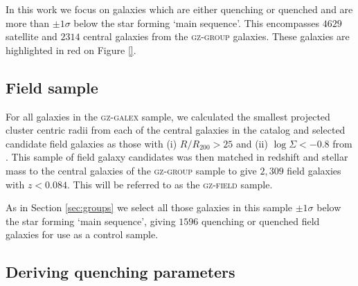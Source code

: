 \documentclass[useAMS,usenatbib]{mn2e}
\begin{document}
In this work we focus on galaxies which are either quenching or quenched and are more than $\pm1\sigma$ below the star forming `main sequence'. This encompasses $4629$ satellite and $2314$ central galaxies from the \textsc{gz-group} galaxies. These galaxies are highlighted in red on Figure \ref{}. 

\subsection{Field sample}\label{sec:field}

For all galaxies in the \textsc{gz-galex} sample, we calculated the smallest projected cluster centric radii from each of the central galaxies in the  \citet{berlind06} catalog and selected candidate field galaxies as those with (i) $R/R_{200} > 25$ and (ii) $\log\Sigma < -0.8$ from \cite{baldry06}. This sample of field galaxy candidates was then matched in redshift and stellar mass to the central galaxies of the \textsc{gz-group} sample to give $2,309$ field galaxies with $z < 0.084$. This will be referred to as the \textsc{gz-field} sample. 

As in Section \ref{sec:groups} we select all those galaxies in this sample $\pm1\sigma$ below the star forming `main sequence', giving $1596$ quenching or quenched field galaxies for use as a control sample.
  
\begin{figure}
\label{fig:zcompare}
\end{figure}


\subsection{Deriving quenching parameters}\label{sec:starpy}
\end{document}
